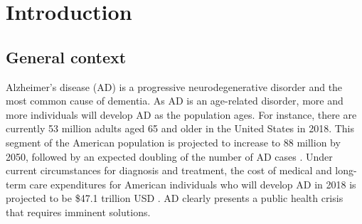 
\chapter{Introduction} %

\label{Chapter1} %

\section{General context}

Alzheimer's disease (AD) is a progressive neurodegenerative disorder and the most common cause of dementia. As AD is an age-related disorder, more and more individuals will develop AD as the population ages. For instance, there are currently 53 million adults aged 65 and older in the United States in 2018. This segment of the American population is projected to increase to 88 million by 2050, followed by an expected doubling of the number of AD cases \citep{Association:2018eq}. Under current circumstances for diagnosis and treatment, the cost of medical and long-term care expenditures for American individuals who will develop AD in 2018 is projected to be \$47.1 trillion USD \citep{Association:2018eq}. AD clearly presents a public health crisis that requires imminent solutions.

